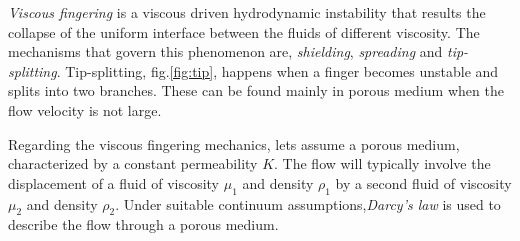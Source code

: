 \documentclass[12pt,a4paper,oneside]{report}%
\begin{document}
\textit{Viscous fingering} is a viscous driven hydrodynamic instability that results the collapse of the uniform interface between the fluids of different viscosity. The mechanisms that govern this phenomenon are,  \textit{shielding}, \textit{spreading} and \textit{tip-splitting}. Tip-splitting, fig.\ref{fig:tip}, happens when a finger becomes unstable and splits into two branches. These can be found mainly in porous medium when the flow velocity is not large. 





 
Regarding the viscous fingering mechanics, lets assume a porous medium, characterized by a constant permeability $K$. The flow will typically involve the displacement of a fluid of viscosity $\mu_1$  and density $\rho_1$ by a second fluid of viscosity $\mu_2$ and density $\rho_2$. Under suitable continuum assumptions,\textit{Darcy's law}  is used to describe the flow through a porous medium.
\end{document}
